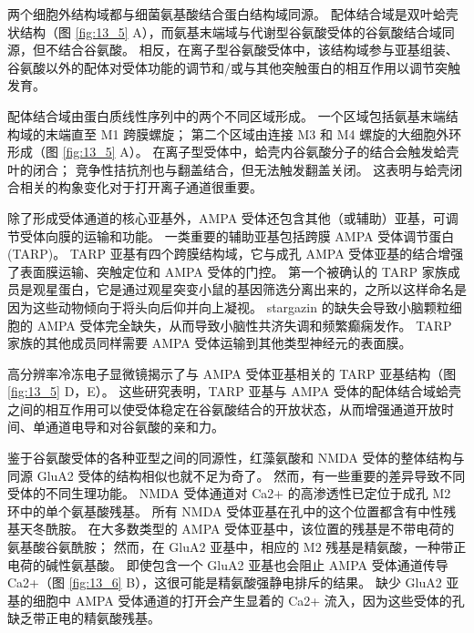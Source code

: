 两个细胞外结构域都与细菌氨基酸结合蛋白结构域同源。 配体结合域是双叶蛤壳状结构（图 \ref{fig:13_5} A），而氨基末端域与代谢型谷氨酸受体的谷氨酸结合域同源，但不结合谷氨酸。 
相反，在离子型谷氨酸受体中，该结构域参与亚基组装、谷氨酸以外的配体对受体功能的调节和/或与其他突触蛋白的相互作用以调节突触发育。


配体结合域由蛋白质线性序列中的两个不同区域形成。 
一个区域包括氨基末端结构域的末端直至 M1 跨膜螺旋； 
第二个区域由连接 M3 和 M4 螺旋的大细胞外环形成（图 \ref{fig:13_5} A）。
在离子型受体中，蛤壳内谷氨酸分子的结合会触发蛤壳叶的闭合； 
竞争性拮抗剂也与翻盖结合，但无法触发翻盖关闭。 
这表明与蛤壳闭合相关的构象变化对于打开离子通道很重要。


除了形成受体通道的核心亚基外，AMPA 受体还包含其他（或辅助）亚基，可调节受体向膜的运输和功能。 
一类重要的辅助亚基包括跨膜 AMPA 受体调节蛋白 (TARP)。 
TARP 亚基有四个跨膜结构域，它与成孔 AMPA 受体亚基的结合增强了表面膜运输、突触定位和 AMPA 受体的门控。 
第一个被确认的 TARP 家族成员是观星蛋白，它是通过观星突变小鼠的基因筛选分离出来的，之所以这样命名是因为这些动物倾向于将头向后仰并向上凝视。 
stargazin 的缺失会导致小脑颗粒细胞的 AMPA 受体完全缺失，从而导致小脑性共济失调和频繁癫痫发作。 
TARP 家族的其他成员同样需要 AMPA 受体运输到其他类型神经元的表面膜。


高分辨率冷冻电子显微镜揭示了与 AMPA 受体亚基相关的 TARP 亚基结构（图 \ref{fig:13_5} D，E）。 
这些研究表明，TARP 亚基与 AMPA 受体的配体结合域蛤壳之间的相互作用可以使受体稳定在谷氨酸结合的开放状态，从而增强通道开放时间、单通道电导和对谷氨酸的亲和力。


鉴于谷氨酸受体的各种亚型之间的同源性，红藻氨酸和 NMDA 受体的整体结构与同源 GluA2 受体的结构相似也就不足为奇了。 
然而，有一些重要的差异导致不同受体的不同生理功能。 
NMDA 受体通道对 Ca2+ 的高渗透性已定位于成孔 M2 环中的单个氨基酸残基。 
所有 NMDA 受体亚基在孔中的这个位置都含有中性残基天冬酰胺。 
在大多数类型的 AMPA 受体亚基中，该位置的残基是不带电荷的氨基酸谷氨酰胺； 
然而，在 GluA2 亚基中，相应的 M2 残基是精氨酸，一种带正电荷的碱性氨基酸。 
即使包含一个 GluA2 亚基也会阻止 AMPA 受体通道传导 Ca2+（图 \ref{fig:13_6} B），这很可能是精氨酸强静电排斥的结果。 
缺少 GluA2 亚基的细胞中 AMPA 受体通道的打开会产生显着的 Ca2+ 流入，因为这些受体的孔缺乏带正电的精氨酸残基。


